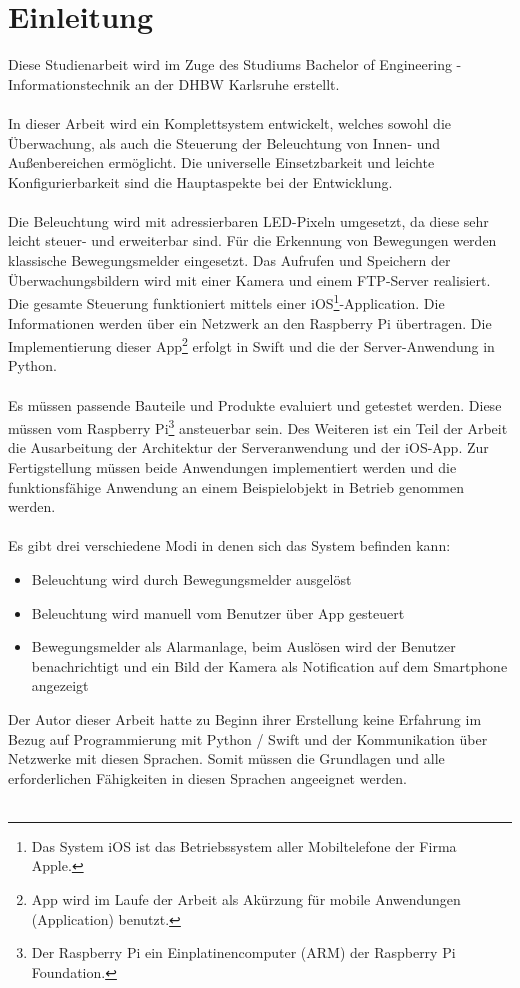 \section{Einleitung}
Diese Studienarbeit wird im Zuge des Studiums Bachelor of Engineering - Informationstechnik an der DHBW Karlsruhe erstellt. \\\\
In dieser Arbeit wird ein Komplettsystem entwickelt, welches sowohl die Überwachung, als auch die Steuerung der Beleuchtung von Innen- und Außenbereichen ermöglicht. Die universelle Einsetzbarkeit und leichte Konfigurierbarkeit sind die Hauptaspekte bei der Entwicklung.\\\\
Die Beleuchtung wird mit adressierbaren LED-Pixeln umgesetzt, da diese sehr leicht steuer- und erweiterbar sind. Für die Erkennung von Bewegungen werden klassische Bewegungsmelder eingesetzt. Das Aufrufen und Speichern der Überwachungsbildern wird mit einer Kamera und einem FTP-Server realisiert. Die gesamte Steuerung funktioniert mittels einer iOS\footnote{Das System iOS ist das Betriebssystem aller Mobiltelefone der Firma Apple.}-Application. Die Informationen werden über ein Netzwerk an den Raspberry Pi übertragen. Die Implementierung dieser App\footnote{App wird im Laufe der Arbeit als Akürzung für mobile Anwendungen (Application) benutzt.} erfolgt in Swift und die der Server-Anwendung in Python.\\\\
Es müssen passende Bauteile und Produkte evaluiert und getestet werden. Diese müssen vom Raspberry Pi\footnote{Der Raspberry Pi ein Einplatinencomputer (ARM) der Raspberry Pi Foundation.} ansteuerbar sein. Des Weiteren ist ein Teil der Arbeit die Ausarbeitung der Architektur der Serveranwendung und der iOS-App. Zur Fertigstellung müssen beide Anwendungen implementiert werden und die funktionsfähige Anwendung an einem Beispielobjekt in Betrieb genommen werden.\\\\
Es gibt drei verschiedene Modi in denen sich das System befinden kann:
\begin{itemize}
\item Beleuchtung wird durch Bewegungsmelder ausgelöst
\item Beleuchtung wird manuell vom Benutzer über App gesteuert 
\item Bewegungsmelder als Alarmanlage, beim Auslösen wird der Benutzer benachrichtigt und ein Bild der Kamera als Notification auf dem Smartphone angezeigt
\end{itemize}
Der Autor dieser Arbeit hatte zu Beginn ihrer Erstellung keine Erfahrung im Bezug auf Programmierung mit Python / Swift und der Kommunikation über Netzwerke mit diesen Sprachen. Somit müssen die Grundlagen und alle erforderlichen Fähigkeiten in diesen Sprachen angeeignet werden. \\\\

